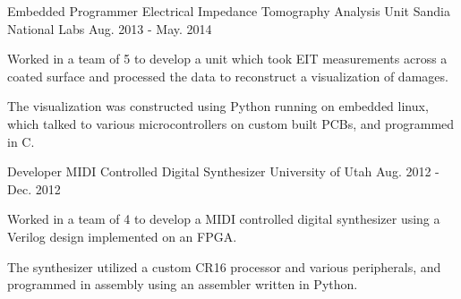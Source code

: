 


\begin{cventries}


\cventry
{Embedded Programmer} %
{Electrical Impedance Tomography Analysis Unit} %
{Sandia National Labs} %
{Aug. 2013 - May. 2014} %
{ %
\begin{cvitems}
\item {Worked in a team of 5 to develop a unit which took EIT measurements across a coated surface and processed the data to reconstruct a visualization of damages.}
\item {The visualization was constructed using Python running on embedded linux, which talked to various microcontrollers on custom built PCBs, and programmed in C.}
\end{cvitems}
}


\cventry
{Developer} %
{MIDI Controlled Digital Synthesizer} %
{University of Utah} %
{Aug. 2012 - Dec. 2012} %
{ %
\begin{cvitems}
\item {Worked in a team of 4 to develop a MIDI controlled digital synthesizer using a Verilog design implemented on an FPGA.}
\item {The synthesizer utilized a custom CR16 processor and various peripherals, and programmed in assembly using an assembler written in Python.}
\end{cvitems}
}


\end{cventries}